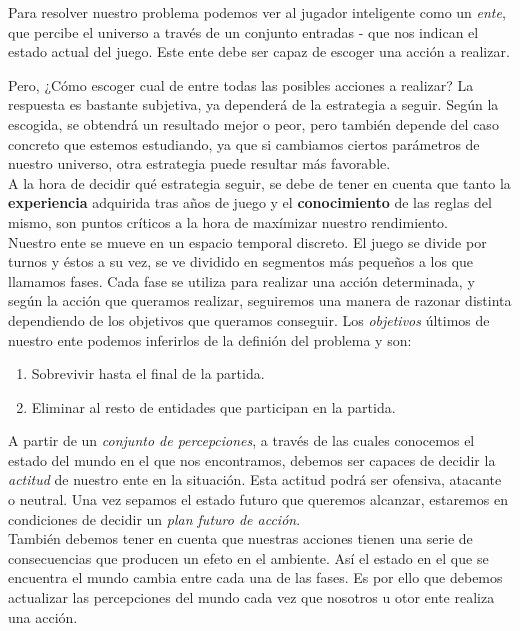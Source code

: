 \documentclass[a4paper,12pt,oneside]{book}
\begin{document}
Para resolver nuestro problema podemos ver al jugador inteligente como
un {\it ente}, que percibe el universo a través de un conjunto
entradas - que nos indican el estado actual del juego. Este ente
debe ser capaz de escoger una acción a realizar.

Pero, ¿Cómo escoger cual de entre todas las posibles acciones a
realizar? La respuesta es bastante subjetiva, ya dependerá de la
estrategia a seguir. Según la escogida, se obtendrá un resultado mejor
o peor, pero también depende del caso concreto que estemos estudiando,
ya que si cambiamos ciertos parámetros de nuestro universo, otra
estrategia puede resultar más favorable.\\

A la hora de decidir qué estrategia seguir, se debe de tener en
cuenta que tanto la {\bf experiencia} adquirida tras años de juego y
el {\bf conocimiento} de las reglas del mismo, son puntos críticos a
la hora de maxímizar nuestro rendimiento.\\

Nuestro ente se mueve en un espacio temporal discreto. El juego se
divide por turnos y éstos a su vez, se ve dividido en segmentos más
pequeños a los que llamamos fases. Cada fase se utiliza para
realizar una acción determinada, y según la acción que queramos
realizar, seguiremos una manera de razonar distinta dependiendo de los
objetivos que queramos conseguir. Los {\it objetivos} últimos de nuestro
ente podemos inferirlos de la definión del problema y son:
\begin{enumerate}
\item Sobrevivir hasta el final de la partida.
\item Eliminar al resto de entidades que participan en la partida.\\
\end{enumerate}

A partir de un {\it conjunto de percepciones}, a través de las cuales
conocemos el estado del mundo en el que nos encontramos, debemos ser
capaces de decidir la {\it actitud } de nuestro ente en la
situación. Esta actitud podrá ser ofensiva, atacante o neutral. Una
vez sepamos el estado futuro que queremos alcanzar, estaremos en
condiciones de decidir un {\it plan futuro de acción}.\\

También debemos tener en cuenta que nuestras acciones tienen una serie
de consecuencias que producen un efeto en el ambiente. Así el estado
en el que se encuentra el mundo cambia entre cada una de las fases. Es
por ello que debemos actualizar las percepciones del mundo cada vez
que nosotros u otor ente realiza una acción.\\
\end{document}
